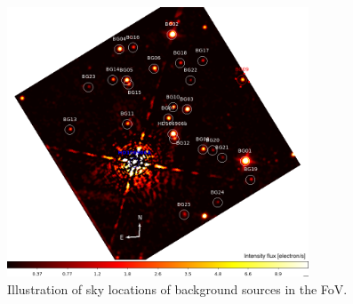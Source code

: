 \documentclass[twocolumn, trackchanges]{aastex62}
\begin{document}
\begin{figure}[h]
  \centering
  \includegraphics[width=0.8\textwidth]{figures/backgroundStar.png}
  \caption{Illustration of sky locations of background sources in the FoV.}
  \label{fig:bck}
\end{figure}
\end{document}

